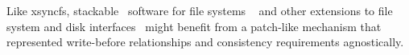 %
%
%
%
Like xsyncfs, stackable \module\ software for file systems%
~\cite{rosenthal90evolving, skinner93stacking,
heidemann94filesystem,zadok99extending,
zadok00fist,wright03ncryptfs,wright06versatility} and other extensions
to file system and disk interfaces~\cite{huang05fs2,sivathanu06typesafe}
might
benefit from a patch-like mechanism that represented write-before
relationships and consistency requirements agnostically.

\begin{comment}
Previous
systems like FiST~\cite{zadok00fist} or GEOM~\cite{geom} generally focus on
an individual portion of the system and thus restrict both what a \module\
can do and how \modules\ can be arranged. FiST, for instance, does not
provide a way to deal with structures on the disk directly -- it provides
only ``wrapper'' functionality around existing file
systems. %
GEOM, on the other hand, deals only with the block device layer, and has no
way to work with the file systems stored on those block devices. Neither
has a formal way of specifying or honoring complex write-ordering
information, which is what \patches\ in \Kudos\ provide. We imagine that
systems like these could be adapted to work with \patches, giving the
benefits of both ideas.

\paragraph{Applications}

A variety of extensions to file systems and disk interfaces have been proposed
in recent work, like the FS2 Free Space File System~\cite{huang05fs2},
encrypting file systems like NCryptfs~\cite{wright03ncryptfs}, and type-safe
disks~\cite{sivathanu06typesafe}. The \Kudos\
\module\ system may provide an interesting platform for implementations 
of these ideas.
\end{comment}


